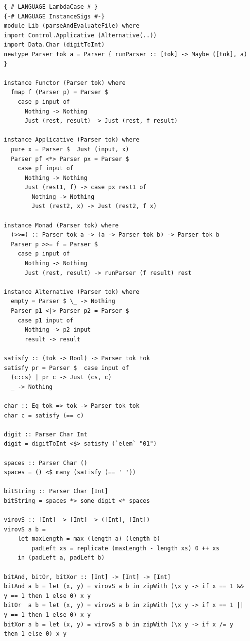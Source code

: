 \documentclass[areasetadvanced]{scrartcl}
\begin{document}
\begin{lstlisting}[caption={Lib.hs}, label=lst:main]
{-# LANGUAGE LambdaCase #-}
{-# LANGUAGE InstanceSigs #-}
module Lib (parseAndEvaluateFile) where
import Control.Applicative (Alternative(..))
import Data.Char (digitToInt)
newtype Parser tok a = Parser { runParser :: [tok] -> Maybe ([tok], a) }

instance Functor (Parser tok) where
  fmap f (Parser p) = Parser $ 
    case p input of
      Nothing -> Nothing
      Just (rest, result) -> Just (rest, f result)

instance Applicative (Parser tok) where
  pure x = Parser $  Just (input, x)
  Parser pf <*> Parser px = Parser $ 
    case pf input of
      Nothing -> Nothing
      Just (rest1, f) -> case px rest1 of
        Nothing -> Nothing
        Just (rest2, x) -> Just (rest2, f x)

instance Monad (Parser tok) where
  (>>=) :: Parser tok a -> (a -> Parser tok b) -> Parser tok b
  Parser p >>= f = Parser $ 
    case p input of
      Nothing -> Nothing
      Just (rest, result) -> runParser (f result) rest

instance Alternative (Parser tok) where
  empty = Parser $ \_ -> Nothing
  Parser p1 <|> Parser p2 = Parser $ 
    case p1 input of
      Nothing -> p2 input
      result -> result

satisfy :: (tok -> Bool) -> Parser tok tok
satisfy pr = Parser $  case input of
  (c:cs) | pr c -> Just (cs, c)
  _ -> Nothing

char :: Eq tok => tok -> Parser tok tok
char c = satisfy (== c)

digit :: Parser Char Int
digit = digitToInt <$> satisfy (`elem` "01")

spaces :: Parser Char ()
spaces = () <$ many (satisfy (== ' '))

bitString :: Parser Char [Int]
bitString = spaces *> some digit <* spaces

virovS :: [Int] -> [Int] -> ([Int], [Int])
virovS a b =
    let maxLength = max (length a) (length b)
        padLeft xs = replicate (maxLength - length xs) 0 ++ xs
    in (padLeft a, padLeft b)

bitAnd, bitOr, bitXor :: [Int] -> [Int] -> [Int]
bitAnd a b = let (x, y) = virovS a b in zipWith (\x y -> if x == 1 && y == 1 then 1 else 0) x y
bitOr  a b = let (x, y) = virovS a b in zipWith (\x y -> if x == 1 || y == 1 then 1 else 0) x y
bitXor a b = let (x, y) = virovS a b in zipWith (\x y -> if x /= y then 1 else 0) x y


\end{lstlisting}
\end{document}
